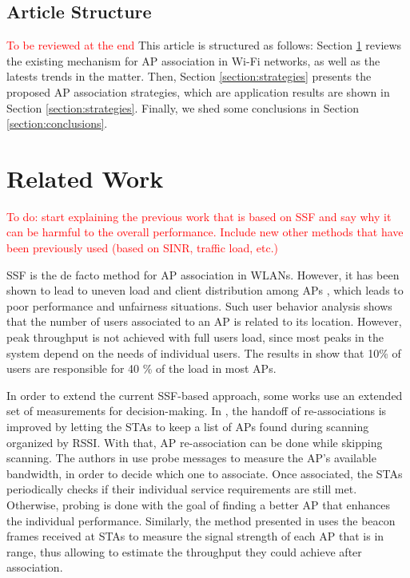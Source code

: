 \documentclass{article}
\begin{document}
	\subsection{Article Structure}
	\label{section:article_structure}
		\textcolor{red}{To be reviewed at the end}
		This article is structured as follows: Section \ref{section:related_work} reviews the existing mechanism for AP association in Wi-Fi networks, as well as the latests trends in the matter. Then, Section \ref{section:strategies} presents the proposed AP association strategies, which are application results are shown in Section \ref{section:strategies}. Finally, we shed some conclusions in Section \ref{section:conclusions}.
		
\section{Related Work}
\label{section:related_work}
	\textcolor{red}{To do: start explaining the previous work that is based on SSF and say why it can be harmful to the overall performance. Include new other methods that have been previously used (based on SINR, traffic load, etc.)}
	
	SSF is the de facto method for AP association in WLANs. However, it has been shown to lead to uneven load and client distribution among APs \cite{anand2002, balazinska2003}, which leads to poor performance and unfairness situations. Such user behavior analysis shows that the number of users associated to an AP is related to its location. However, peak throughput is not achieved with full users load, since most peaks in the system depend on the needs of individual users. The results in \cite{balazinska2003} show that 10\% of users are responsible for 40 \% of the load in most APs.
	
	In order to extend the current SSF-based approach, some works use an extended set of measurements for decision-making. In \cite{shin2004}, the handoff of re-associations is improved by letting the STAs to keep a list of APs found during scanning organized by RSSI. With that, AP re-association can be done while skipping scanning. The authors in \cite{sun2004} use probe messages to measure the AP's available bandwidth, in order to decide which one to associate. Once associated, the STAs periodically checks if their individual service requirements are still met. Otherwise, probing is done with the goal of finding a better AP that enhances the individual performance. Similarly, the method presented in \cite{gong2012} uses the beacon frames received at STAs to measure the signal strength of each AP that is in range, thus allowing to estimate the throughput they could achieve after association.	
	
\end{document}
